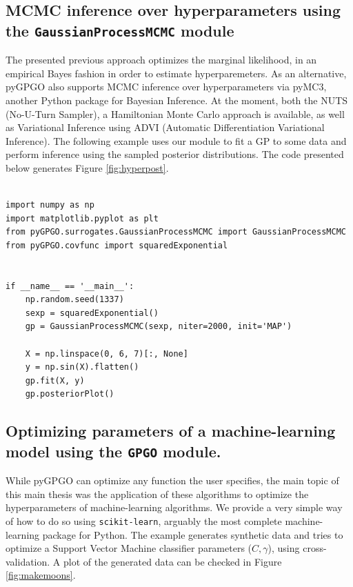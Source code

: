 \documentclass[10pt,a4paper,twoside]{book}
\begin{document}
\subsection{MCMC inference over hyperparameters using the \texttt{GaussianProcessMCMC} module}

The presented previous approach optimizes the marginal likelihood, in an empirical Bayes fashion in order to estimate hyperparemeters. As an alternative, pyGPGO also supports MCMC inference over hyperparameters via pyMC3, another Python package for Bayesian Inference. At the moment, both the NUTS \cite{Hoffman2014} (No-U-Turn Sampler), a Hamiltonian Monte Carlo approach is available, as well as Variational Inference using ADVI \cite{Kucukelbir2016} (Automatic Differentiation Variational Inference). The following example uses our module to fit a GP to some data and perform inference using the sampled posterior distributions. The code presented below generates Figure \ref{fig:hyperpost}.

\begin{verbatim}
               
import numpy as np
import matplotlib.pyplot as plt
from pyGPGO.surrogates.GaussianProcessMCMC import GaussianProcessMCMC
from pyGPGO.covfunc import squaredExponential


if __name__ == '__main__':
    np.random.seed(1337)
    sexp = squaredExponential()
    gp = GaussianProcessMCMC(sexp, niter=2000, init='MAP')

    X = np.linspace(0, 6, 7)[:, None]
    y = np.sin(X).flatten()
    gp.fit(X, y)
    gp.posteriorPlot()               
\end{verbatim}


\subsection{Optimizing parameters of a machine-learning model using the \texttt{GPGO} module.}

While pyGPGO can optimize any function the user specifies, the main topic of this main thesis was the application of these algorithms to optimize the hyperparameters of machine-learning algorithms. We provide a very simple way of how to do so using \texttt{scikit-learn}, arguably the most complete machine-learning package for Python. The example generates synthetic data and tries to optimize a Support Vector Machine classifier parameters ($C, \gamma$), using cross-validation. A plot of the generated data can be checked in Figure \ref{fig:makemoons}.\\
\end{document}
